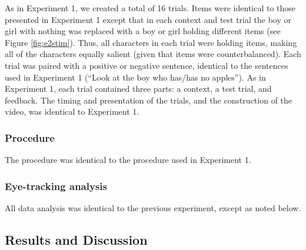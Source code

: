 \documentclass[man]{apa2}
\begin{document}
As in Experiment 1, we created a total of 16 trials.  Items were identical to those presented in Experiment 1 except that in each context and test trial the boy or girl with nothing was replaced with a boy or girl holding different items (see Figure \ref{fig:e2stim}).  Thus, all characters in each trial were holding items, making all of the characters equally salient (given that items were counterbalanced).  Each trial was paired with a positive or negative sentence, identical to the sentences used in Experiment 1 (``Look at the boy who has/has no apples'').  As in Experiment 1, each trial contained three parts: a context, a test trial, and feedback.  The timing and presentation of the trials, and the construction of the video, was identical to Experiment 1.  

\subsubsection{Procedure}

The procedure was identical to the procedure used in Experiment 1.  

\subsubsection{Eye-tracking analysis}

All data analysis was identical to the previous experiment, except as noted below.


\subsection{Results and Discussion}
\end{document}
